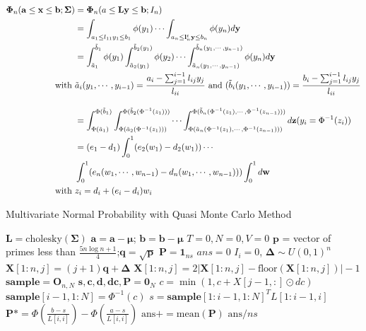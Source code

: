 \begin{align}
\boldsymbol{\Phi}_n(\mathbf{a}\leq\mathbf{x}\leq\mathbf{b};\boldsymbol{\Sigma})
&=\boldsymbol{\Phi}_n(a\leq\mathbf{Ly}\leq\mathbf{b};I_n)\nonumber\\
&=\int_{a_1\leq l_{11}y_1\leq b_1}\phi(y_1)\cdots\int_{a_n\leq\mathbf{l}_n^t\mathbf{y}\leq b_n}\phi(y_n)d\mathbf{y}\nonumber\\
&=\int_{\tilde{a}_1}^{\tilde{b}_1}\phi(y_1)
\int_{\tilde{a}_2(y_1)}^{\tilde{b}_2(y_1)}\phi(y_2)\cdots
\int_{\tilde{a}_n(y_1,\cdots,y_{n-1})}^{\tilde{b}_n(y_1,\cdots,y_{n-1})}\phi(y_n)d\mathbf{y}\nonumber\\
\text{with } & \tilde{a}_i(y_1,\cdots,y_{i-1})=\frac{a_i-\sum_{j=1}^{i-1}l_{ij}y_j}{l_{ii}}\text{ and }
(\tilde{b}_i(y_1,\cdots,y_{i-1}))=\frac{b_i-\sum_{j=1}^{i-1}l_{ij}y_j}{l_{ii}}\nonumber\\
\intertext{}
&=\int_{\Phi(\tilde{a}_1)}^{\Phi(\tilde{b}_1)}
\int_{\Phi(\tilde{a}_2(\Phi^{-1}(z_1)))}^{\Phi(\tilde{b}_2(\Phi^{-1}(z_1)))}\cdots
\int_{\Phi(\tilde{a}_n(\Phi^{-1}(z_1),\cdots,\Phi^{-1}(z_{n-1})))}^{\Phi(\tilde{b}_n(\Phi^{-1}(z_1),\cdots,\Phi^{-1}(z_{n-1})))}
d\mathbf{z}(y_i=\Phi^{-1}(z_i))\nonumber\nonumber\\
&=(e_1-d_1)\int_0^1(e_2(w_1)-d_2(w_1))\cdots\nonumber\\
&\int_0^1(e_n(w_1,\cdots,w_{n-1}) - d_n(w_1,\cdots,w_{n-1})))\int_0^1d\mathbf{w}\nonumber\\
\text{with } & z_i=d_i+(e_i-d_i)w_i 
\label{eqn:qmc}
\end{align}

\begin{algorithm}[ht]
	\caption{Multivariate Normal Probability with Quasi Monte Carlo Method}
	\begin{algorithmic}[1]
		\State $\mathbf{L}=\text{cholesky}(\boldsymbol{\Sigma})$
		\State $\mathbf{a}=\mathbf{a}-\boldsymbol{\mu}$; $\mathbf{b}=\mathbf{b}-\boldsymbol{\mu}$
		\State $T=0,N=0,V=0$
		\State $\mathbf{p}$ = vector of primes less than $\frac{5n\log{n+1}}{4}$;$\mathbf{q}=\sqrt{\mathbf{p}}$
		\State $\mathbf{P}=\mathbf{1}_{ns}$
		\State $ans = 0$
		\State $I_i=0$, $\boldsymbol{\Delta}\sim U(0,1)^n$
		\State $\mathbf{X}[1:n,j]=(j+1)\mathbf{q}+\boldsymbol{\Delta}$
		\State $\mathbf{X}[1:n,j]=2\lvert\mathbf{X}[1:n,j]-\text{floor}(\mathbf{X}[1:n,j])\rvert-1$
		\EndFor
		\State $\mathbf{sample}=\mathbf{O}_{n,N}$
		\State $\mathbf{s},\mathbf{c},\mathbf{d},\mathbf{dc}, \mathbf{P}=\mathbf{0}_N$
		\State $c=\min(1, c + X[j-1,:]\odot dc)$
		\State $\mathbf{sample}[i-1,1:N] = \Phi^{-1}(c)$
		\State $s = \mathbf{sample}[1:i-1,1:N]^TL[1:i-1, i]$
		\EndIf
		\State $\mathbf{P} *= \Phi(\frac{b-s}{L[i,i]}) - \Phi(\frac{a-s}{L[i,i]})$
		\EndFor
		\State $\text{ans} += \text{mean}(\mathbf{P})$
		\EndFor
		\State\Return $\text{ans}/ns$
		\EndProcedure
	\end{algorithmic}\label{alg:QMC}
\end{algorithm}


